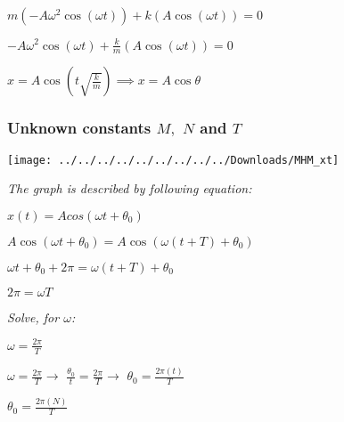 \documentclass{article}
\begin{document}

\begin{center}
$m(- A\omega^2\cos(\omega t)) + k(A\cos(\omega t)) = 0 
$
\end{center}

\begin{center}
	$- A\omega^2\cos(\omega t) + \frac{k}{m}(A\cos(\omega t)) = 0 
	$
\end{center}
\newpage
{}
\begin{center}
$ x = A\cos\left(t\sqrt{\frac{k}{m}}\right) \implies x = A\cos\theta
$
\end{center}























		








\subsubsection{Unknown constants $M,$ $N$ and $T$}
\begin{center}
	\centering
	\texttt{[image: ../../../../../../../../../Downloads/MHM\_xt]}
	\label{fig:mhmxt}
\end{center}
\textit{The graph is described by following equation:}
\begin{center}
	$x(t) = Acos(\omega t + \theta_0)
	$
\end{center}

\begin{center}
	$A\cos(\omega t + \theta_{0}) = A\cos(\omega(t+T)+\theta_0)
	$

$  \omega t + \theta_0 + 2\pi = \omega(t+T) + \theta_0
$

$  2\pi = \omega T
$
\end{center}
\textit{Solve, for $\omega$:}
\begin{center}
	$ \boxed{\omega = \frac{2\pi}{T}}
	$
\end{center}
\begin{center}
	$ \omega = \frac{2\pi}{T} \rightarrow
$
	$ \frac{\theta_0}{t} = \frac{2\pi}{T} \rightarrow
	$
	$\theta_0 = \frac{2\pi(t)}{T}
	$
	
	$\boxed{\theta_0 = \frac{2\pi(N)}{T}}
	$
\end{center}
\end{document}
